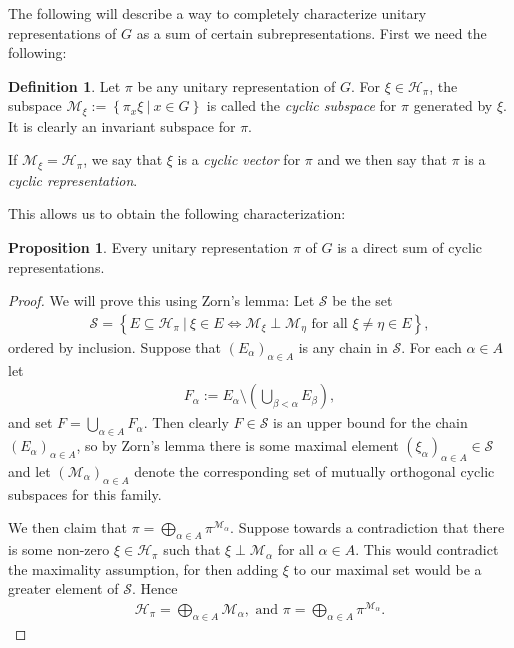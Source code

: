 \documentclass[10pt,twoside,openany,final]{memoir}
\theoremstyle{definition}
\newtheorem{proposition}[theorem]{Proposition}
\newtheorem{definition}[theorem]{Definition}
\theoremstyle{Break}
\renewcommand{\H}{\mathcal{H}}
\begin{document}
The following will describe a way to completely characterize unitary representations of $G$ as a sum of certain subrepresentations. First we need the following:
\begin{definition}
Let $\pi$ be any unitary representation of $G$. For $\xi \in \H_\pi$, the subspace $\mathcal{M}_\xi:=\left\{ \pi_x \xi \ | \ x \in G \right\}$ is called the \emph{cyclic subspace} for $\pi$ generated by $\xi$. It is clearly an invariant subspace for $\pi$.

If $\mathcal{M}_\xi=\H_\pi$, we say that $\xi$ is a \emph{cyclic vector} for $\pi$ and we then say that $\pi$ is a \emph{cyclic representation}.
\end{definition}
This allows us to obtain the following characterization:
\begin{proposition}
Every unitary representation $\pi$ of $G$ is a direct sum of cyclic representations.
\label{3.10}
\end{proposition}
\begin{proof}
We will prove this using Zorn's lemma: Let $\mathcal{S}$ be the set 
\begin{align*}
	\mathcal{S}=\left\{ E \subseteq \H_\pi \ | \ \xi\in E \iff \mathcal{M}_\xi \perp \mathcal{M}_{\eta} \text{ for all } \xi\neq \eta\in E \right\},
\end{align*}
ordered by inclusion. Suppose that $(E_\alpha)_{\alpha \in A}$ is any chain in $\mathcal{S}$. For each $\alpha \in A$ let
\begin{align*}
	F_\alpha:= E_\alpha \setminus\left( \bigcup_{\beta < \alpha} E_\beta \right),	
\end{align*}
and set $F = \bigcup_{\alpha \in A} F_\alpha$. Then clearly $F \in \mathcal{S}$ is an upper bound for the chain $\left( E_\alpha \right)_{\alpha \in A}$, so by Zorn's lemma there is some maximal element $\left( \xi_\alpha \right)_{\alpha \in A} \in \mathcal{S}$ and let $\left( \mathcal{M}_\alpha \right)_{\alpha \in A}$ denote the corresponding set of mutually orthogonal cyclic subspaces for this family.

We then claim that $\pi=\bigoplus_{\alpha \in A}\pi^{\mathcal{M}_\alpha}$. Suppose towards a contradiction that there is some non-zero $ \xi \in \H_\pi$ such that $\xi \perp \mathcal{M}_\alpha$ for all $\alpha \in A$. This would contradict the maximality assumption, for then adding $\xi$ to our maximal set would be a greater element of $\mathcal{S}$. Hence
\begin{align*}
\H_\pi=\bigoplus_{\alpha \in A} \mathcal{M}_\alpha, \text{ and } \pi=\bigoplus_{\alpha \in A} \pi^{\mathcal{M}_\alpha}.
\end{align*}
\end{proof}
\end{document}
